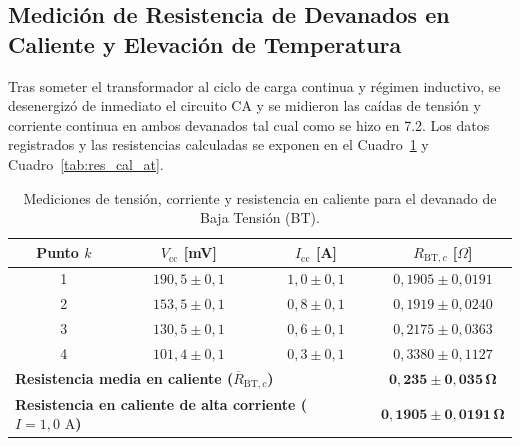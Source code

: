 \subsection{Medición de Resistencia de Devanados en Caliente y Elevación de Temperatura}

Tras someter el transformador al ciclo de carga continua y régimen inductivo, se desenergizó de inmediato el circuito CA y se midieron las caídas de tensión y corriente continua en ambos devanados tal cual como se hizo en 7.2. Los datos registrados y las resistencias calculadas se exponen en el Cuadro~\ref{tab:res_cal_bt} y Cuadro~\ref{tab:res_cal_at}.

\begin{table}[htbp]
    \centering
    \caption{Mediciones de tensión, corriente y resistencia en caliente para el devanado de Baja Tensión (BT).}
    \label{tab:res_cal_bt}
    \begin{tabular}{c c c c}
        \toprule
        \textbf{Punto $k$} & \textbf{$V_{\text{cc}}$ [mV]} & \textbf{$I_{\text{cc}}$ [A]} & \textbf{$R_{\text{BT},c}$ [$\Omega$]} \\
        \midrule
        1 & $190{,}5 \pm 0{,}1$ & $1{,}0 \pm 0{,}1$ & $0{,}1905 \pm 0{,}0191$ \\
        2 & $153{,}5 \pm 0{,}1$ & $0{,}8 \pm 0{,}1$ & $0{,}1919 \pm 0{,}0240$ \\
        3 & $130{,}5 \pm 0{,}1$ & $0{,}6 \pm 0{,}1$ & $0{,}2175 \pm 0{,}0363$ \\
        4 & $101{,}4 \pm 0{,}1$ & $0{,}3 \pm 0{,}1$ & $0{,}3380 \pm 0{,}1127$ \\
        \midrule
        \multicolumn{3}{l}{\textbf{Resistencia media en caliente ($\overline{R}_{\text{BT},c}$)}} & $\mathbf{0{,}235 \pm 0{,}035\,\Omega}$ \\
        \multicolumn{3}{l}{\textbf{Resistencia en caliente de alta corriente ($I = 1{,}0\text{ A}$)}} & $\mathbf{0{,}1905 \pm 0{,}0191\,\Omega}$ \\
        \bottomrule
    \end{tabular}
\end{table}

